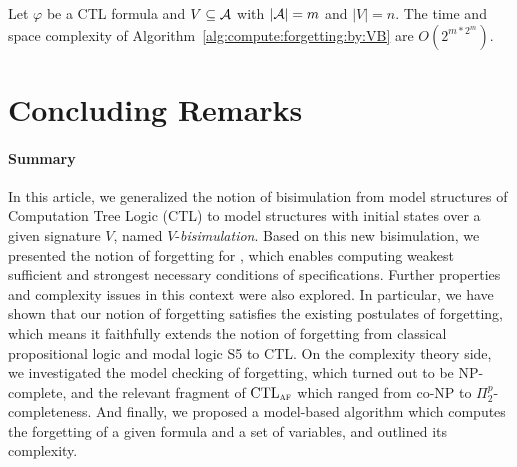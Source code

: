 \documentclass{article}
\begin{document}


\begin{proposition}\label{pro:time:alg1}
 Let $\varphi$ be a CTL formula and $V\subseteq {\cal A}$ with $|{\cal A}|=m$ and $|V|=n$. The time and space complexity of
Algorithm~\ref{alg:compute:forgetting:by:VB} are $O(2^{m*2^m})$.%
\end{proposition}

\section{Concluding Remarks}
\paragraph{Summary}
In this article, we generalized the notion of bisimulation from model structures of Computation Tree Logic (CTL) to model structures with initial states over a given signature $V$, named $V$-{\em bisimulation}.
Based on this new bisimulation, we presented the notion of forgetting for \CTL, which enables computing weakest sufficient and strongest necessary conditions of specifications. Further properties and complexity issues in this context were also explored. In particular, we have shown that our notion of forgetting satisfies the existing postulates of forgetting, which means it faithfully extends the notion of forgetting from classical propositional logic and modal logic S5 to CTL. On the complexity theory side, we investigated the model checking of forgetting, which turned out to be NP-complete, and the relevant fragment of $\textrm{CTL}_{\textsc{a}\textsc{f}}$ which ranged from co-NP to $\Pi_2^p$-completeness.  And finally, we proposed a model-based algorithm which computes the forgetting of a given formula and a set of variables, and outlined its complexity.  
\end{document}
